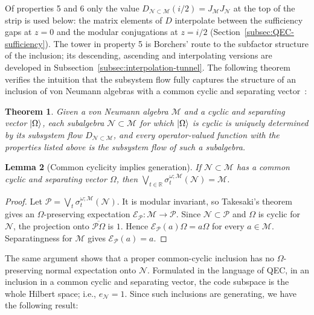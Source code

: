 \documentclass[a4paper,11pt]{article}
\newtheorem{theorem}{Theorem}
\newtheorem{lemma}[theorem]{Lemma}
\theoremstyle{definition}
\newcommand{\mP}{\mathcal{P}}
\newcommand{\mN}{\mathcal{N}}
\newcommand{\mM}{\mathcal{M}}
\newcommand{\mE}{\mathcal{E}}
\begin{document}
Of properties 5 and 6 only the value $D_{\mN\subset\mM}(i/2)=J_{\mM}J_{\mN}$ at the top of the strip is used below: the matrix elements of $D$ interpolate between the sufficiency gaps at $z=0$ and the modular conjugations at $z=i/2$ (Section~\ref{subsec:QEC-sufficiency}). The tower in property 5 is Borchers' route to the subfactor structure of the inclusion; its descending, ascending and interpolating versions are developed in Subsection~\ref{subsec:interpolation-tunnel}. The following theorem verifies the intuition that the subsystem flow fully captures the structure of an inclusion of von Neumann algebras with a common cyclic and separating vector~\cite{revolutionizing}:
\begin{theorem}
    Given a von Neumann algebra $\mM$ and a cyclic and separating vector $\ket{\Omega}$, each subalgebra $\mN\subset\mM$ for which $\ket{\Omega}$ is cyclic is uniquely determined by its subsystem flow $D_{\mN\subset\mM}$, and every operator-valued function with the properties listed above is the subsystem flow of such a subalgebra.
\end{theorem}

\begin{lemma}[Common cyclicity implies generation]\label{lem:common-cyclicity-generating}
If $\mN\subset\mM$ has a common cyclic and separating vector $\Omega$, then
$\bigvee_{t\in\mathbb R}\sigma^{\omega;\mM}_t(\mN)=\mM$.
\end{lemma}
\begin{proof}
Let $\mP=\bigvee_t\sigma^{\omega;\mM}_t(\mN)$. It is modular invariant, so Takesaki's theorem
gives an $\Omega$-preserving expectation $\mE_{\mP}:\mM\to\mP$.
Since $\mN\subset\mP$ and $\Omega$ is cyclic for $\mN$, the projection onto
$\overline{\mP\Omega}$ is $1$. Hence $\mE_{\mP}(a)\Omega=a\Omega$ for every $a\in\mM$.
Separatingness for $\mM$ gives $\mE_{\mP}(a)=a$.
\end{proof}
The same argument shows that a proper common-cyclic inclusion has no
$\Omega$-preserving normal expectation onto $\mN$. Formulated in the language of QEC, in an inclusion in a common cyclic and separating vector, the code subspace is the whole Hilbert space; i.e., $e_{\mN}=1$. Since such inclusions are generating, we have the following result:
\end{document}
